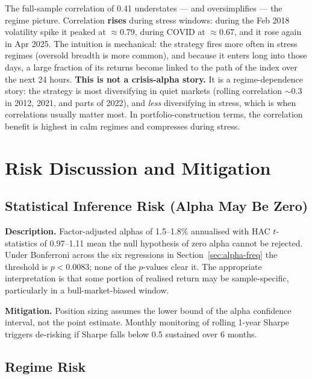\documentclass[11pt]{article}
\begin{document}
The full-sample correlation of 0.41 understates --- and oversimplifies ---
the regime picture. Correlation \textbf{rises} during stress windows:
during the Feb 2018 volatility spike it peaked at $\approx 0.79$, during
COVID at $\approx 0.67$, and it rose again in Apr 2025. The intuition is
mechanical: the strategy fires more often in stress regimes (oversold
breadth is more common), and because it enters long into those days, a
large fraction of its returns become linked to the path of the index over
the next 24 hours. \textbf{This is not a crisis-alpha story.} It is a
regime-dependence story: the strategy is most diversifying in quiet
markets (rolling correlation $\sim 0.3$ in 2012, 2021, and parts of 2022),
and \emph{less} diversifying in stress, which is when correlations usually
matter most. In portfolio-construction terms, the correlation benefit is
highest in calm regimes and compresses during stress.

\newpage

\section{Risk Discussion and Mitigation}
\label{sec:risk}

\subsection{Statistical Inference Risk (Alpha May Be Zero)}

\textbf{Description.} Factor-adjusted alphas of 1.5--1.8\% annualised with
HAC $t$-statistics of 0.97--1.11 mean the null hypothesis of zero alpha
cannot be rejected. Under Bonferroni across the six regressions in
Section~\ref{sec:alpha-freq} the threshold is $p < 0.0083$; none of the
$p$-values clear it. The appropriate interpretation is that some portion of
realised return may be sample-specific, particularly in a bull-market-biased
window.

\textbf{Mitigation.} Position sizing assumes the lower bound of the alpha
confidence interval, not the point estimate. Monthly monitoring of rolling
1-year Sharpe triggers de-risking if Sharpe falls below 0.5 sustained over
6 months.

\subsection{Regime Risk}
\end{document}
